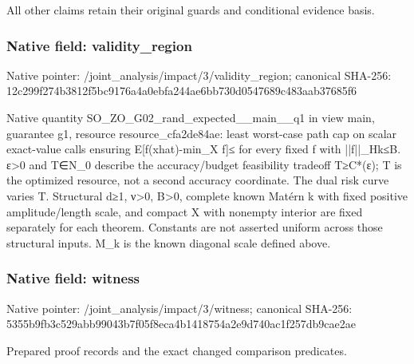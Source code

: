 \documentclass[10pt,a4paper]{article}
\begin{document}
\begingroup\raggedright\sloppy All other claims retain their original guards and conditional evidence basis.\par\endgroup

\subsubsection{Native field: validity\_\allowbreak{}region}
Native pointer: /joint\_\allowbreak{}analysis/impact/3/validity\_\allowbreak{}region; canonical SHA-256: 12c299f274b3812f5bc9176a4a0ebfa244ae6bb730d0547689c483aab37685f6

\begingroup\raggedright\sloppy Native quantity SO\_\allowbreak{}ZO\_\allowbreak{}G02\_\allowbreak{}rand\_\allowbreak{}expected\_\allowbreak{}\_\allowbreak{}main\_\allowbreak{}\_\allowbreak{}q1 in view main,\allowbreak{} guarantee g1,\allowbreak{} resource resource\_\allowbreak{}cfa2de84ae:\allowbreak{} least worst-case path cap on scalar exact-value calls ensuring E[f(xhat)-min\_\allowbreak{}X f]{\AtlasUnicodeSymbols ≤}\allowbreak{} for every fixed f with ||f||\_\allowbreak{}Hk{\AtlasUnicodeSymbols ≤}\allowbreak{}B. {\AtlasUnicodeText ε}\allowbreak{}>0 and T{\AtlasUnicodeSymbols ∈}\allowbreak{}N\_\allowbreak{}0 describe the accuracy/\allowbreak{}budget feasibility tradeoff T{\AtlasUnicodeSymbols ≥}\allowbreak{}C*({\AtlasUnicodeText ε}\allowbreak{});\allowbreak{} T is the optimized resource,\allowbreak{} not a second accuracy coordinate. The dual risk curve varies T. Structural d{\AtlasUnicodeSymbols ≥}\allowbreak{}1,\allowbreak{} {\AtlasUnicodeText ν}\allowbreak{}>0,\allowbreak{} B>0,\allowbreak{} complete known Mat{\AtlasUnicodeText é}\allowbreak{}rn k with fixed positive amplitude/\allowbreak{}length scale,\allowbreak{} and compact X with nonempty interior are fixed separately for each theorem. Constants are not asserted uniform across those structural inputs. M\_\allowbreak{}k is the known diagonal scale defined above.\par\endgroup

\subsubsection{Native field: witness}
Native pointer: /joint\_\allowbreak{}analysis/impact/3/witness; canonical SHA-256: 5355b9fb3c529abb99043b7f05f8eca4b1418754a2e9d740ac1f257db9cae2ae

\begingroup\raggedright\sloppy Prepared proof records and the exact changed comparison predicates.\par\endgroup
\end{document}
